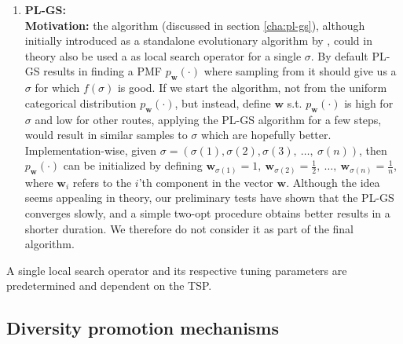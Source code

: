 \documentclass[a4paper,10pt]{article}
\newcommand{\ReplaceMe}[1]{{\color{blue}#1}}
\begin{document}
\begin{enumerate}
		\item \textbf{PL-GS:} \\
		\textbf{Motivation:} the algorithm (discussed in section \ref{cha:pl-gs}), although initially introduced as a standalone evolutionary algorithm by \citeauthor{santucci_gradient_2020}, could in theory also be used a as local search operator for a single $\sigma$. By default PL-GS results in finding a PMF $p_\mathbf{w}(\cdot)$ where sampling from it should give us a $\sigma$ for which $f(\sigma)$ is good. If we start the algorithm, not from the uniform categorical distribution $p_\mathbf{w}(\cdot)$, but instead, define $\mathbf{w}$ s.t. $p_\mathbf{w}(\cdot)$ is high for $\sigma$ and low for other routes, applying the PL-GS algorithm for a few steps, would result in similar samples to $\sigma$ which are hopefully better. \\
		Implementation-wise, given $\sigma = \left( \sigma(1), \sigma(2), \sigma(3),~\dots,~\sigma(n) \right)$, then $p_\mathbf{w}(\cdot)$ can be initialized by defining $\mathbf{w}_{\sigma(1)} = 1,~\mathbf{w}_{\sigma(2)} = \frac{1}{2},~\dots,~\mathbf{w}_{\sigma(n)} = \frac{1}{n}$, where $\mathbf{w}_i$ refers to the $i$'th component in the vector $\mathbf{w}$. Although the idea seems appealing in theory, our preliminary tests have shown that the PL-GS converges slowly, and a simple two-opt procedure obtains better results in a shorter duration. We therefore do not consider it as part of the final algorithm.
	\end{enumerate}
	A single local search operator and its respective tuning parameters are predetermined and dependent on the TSP.
		



\subsection{Diversity promotion mechanisms} \label{cha:diversity}
	
\end{document}
